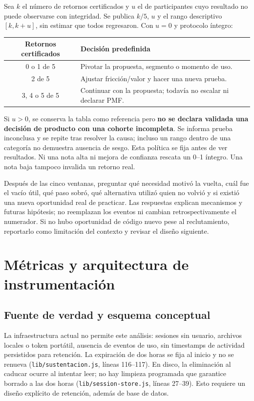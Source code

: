 \documentclass[11pt,a4paper]{report}
\newcommand{\src}[2]{\nolinkurl{#1}, líneas #2}
\begin{document}
Sea \(k\) el número de retornos certificados y \(u\) el de participantes cuyo resultado no puede observarse con integridad. Se publica \(k/5\), \(u\) y el rango descriptivo \([k,k+u]\), sin estimar que todos regresaron. Con \(u=0\) y protocolo íntegro:
\begin{center}
\begin{tabular}{cl}
\toprule Retornos certificados & Decisión predefinida\\\midrule
0 o 1 de 5 & Pivotar la propuesta, segmento o momento de uso.\\
2 de 5 & Ajustar fricción/valor y hacer una nueva prueba.\\
3, 4 o 5 de 5 & Continuar con la propuesta; todavía no escalar ni declarar PMF.\\\bottomrule
\end{tabular}
\end{center}
Si \(u>0\), se conserva la tabla como referencia pero \textbf{no se declara validada una decisión de producto con una cohorte incompleta}. Se informa prueba inconclusa y se repite tras resolver la causa; incluso un rango dentro de una categoría no demuestra ausencia de sesgo. Esta política se fija antes de ver resultados. Ni una nota alta ni mejora de confianza rescata un 0--1 íntegro. Una nota baja tampoco invalida un retorno real.

Después de las cinco ventanas, preguntar qué necesidad motivó la vuelta, cuál fue el vacío útil, qué paso sobró, qué alternativa utilizó quien no volvió y si existió una nueva oportunidad real de practicar. Las respuestas explican mecanismos y futuras hipótesis; no reemplazan los eventos ni cambian retrospectivamente el numerador. Si no hubo oportunidad de código nuevo pese al reclutamiento, reportarlo como limitación del contexto y revisar el diseño siguiente.

\chapter{Métricas y arquitectura de instrumentación}
\label{ch:medicion}
\section{Fuente de verdad y esquema conceptual}
La infraestructura actual no permite este análisis: sesiones sin usuario, archivos locales o token portátil, ausencia de eventos de uso, sin timestamps de actividad persistidos para retención. La expiración de dos horas se fija al inicio y no se renueva (\src{lib/sustentacion.js}{116--117}). En disco, la eliminación al caducar ocurre al intentar leer; no hay limpieza programada que garantice borrado a las dos horas (\src{lib/session-store.js}{27--39}). Esto requiere un diseño explícito de retención, además de base de datos.
\end{document}
